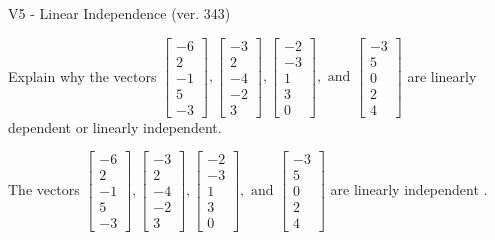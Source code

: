 \begin{exercise}
  \begin{exerciseTitle}V5 - Linear Independence (ver. 343)\end{exerciseTitle}
  \begin{exerciseStatement}
    Explain why the vectors \(\left[\begin{array}{r}
-6 \\
2 \\
-1 \\
5 \\
-3
\end{array}\right] , \left[\begin{array}{r}
-3 \\
2 \\
-4 \\
-2 \\
3
\end{array}\right] , \left[\begin{array}{r}
-2 \\
-3 \\
1 \\
3 \\
0
\end{array}\right] , \text{ and } \left[\begin{array}{r}
-3 \\
5 \\
0 \\
2 \\
4
\end{array}\right]\) are linearly dependent or linearly independent.	


  \end{exerciseStatement}
  \begin{exerciseAnswer}
   The vectors \(\left[\begin{array}{r}
-6 \\
2 \\
-1 \\
5 \\
-3
\end{array}\right] , \left[\begin{array}{r}
-3 \\
2 \\
-4 \\
-2 \\
3
\end{array}\right] , \left[\begin{array}{r}
-2 \\
-3 \\
1 \\
3 \\
0
\end{array}\right] , \text{ and } \left[\begin{array}{r}
-3 \\
5 \\
0 \\
2 \\
4
\end{array}\right]\) are 
  	 linearly independent  .
  


  \end{exerciseAnswer}
\end{exercise}